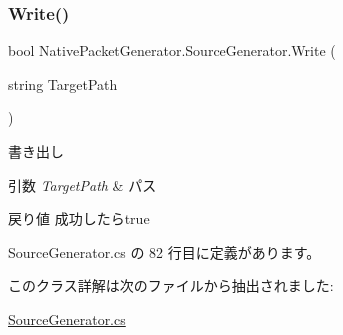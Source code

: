 \mbox{\label{classNativePacketGenerator_1_1SourceGenerator_aa5979e5d36fb06fcc2466b088f230dfd}} 
\subsubsection{\texorpdfstring{Write()}{Write()}}
{\footnotesize\ttfamily bool Native\+Packet\+Generator.\+Source\+Generator.\+Write (\begin{DoxyParamCaption}\item[{string}]{Target\+Path }\end{DoxyParamCaption})}



書き出し 


\begin{DoxyParams}{引数}
{\em Target\+Path} & パス\\
\hline
\end{DoxyParams}
\begin{DoxyReturn}{戻り値}
成功したらtrue
\end{DoxyReturn}


 Source\+Generator.\+cs の 82 行目に定義があります。



このクラス詳解は次のファイルから抽出されました\+:\begin{DoxyCompactItemize}
\item 
\mbox{\hyperlink{SourceGenerator_8cs}{Source\+Generator.\+cs}}\end{DoxyCompactItemize}
